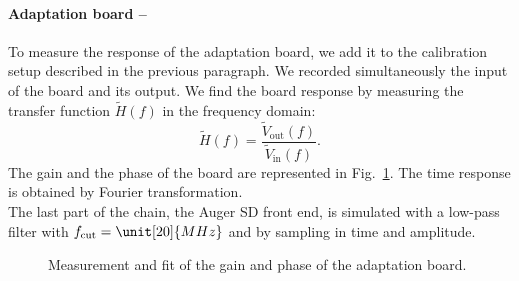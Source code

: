 \paragraph{Adaptation board --}
To measure  the response  of the  adaptation board, we  add it  to the
calibration setup  described in  the previous paragraph.   We recorded
simultaneously  the input of  the board  and its  output. We  find the
board response  by measuring the transfer function $\tilde{H}(f)$  in the frequency
domain:
\begin{equation}
  \tilde{H}(f)                                                        =
  \frac{\tilde{V}_{\text{out}}(f)}{\tilde{V}_{\text{in}}(f)}.
\end{equation}
The   gain  and   the  phase   of   the  board   are  represented   in
Fig.~\ref{fig:board}.  The  time   response  is  obtained  by  Fourier
transformation. \\The last part of  the chain, the Auger SD front end, is
simulated   with  a   low-pass   filter  with   $   f_{\text{cut}}  =
\unit[20]{MHz}$ and by sampling in time and amplitude.
\begin{figure}[!ht]
 \centering
 \hspace*{-3ex}
 \caption{Measurement and fit of the gain and phase of the adaptation board.}
 \label{fig:board}
\end{figure}
